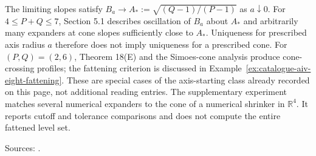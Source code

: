 \begin{example}
The limiting slopes satisfy $B_a\to A_*:=\sqrt{(Q-1)/(P-1)}$ as $a\downarrow0$. For $4\leq P+Q\leq7$, Section 5.1 describes oscillation of $B_a$ about $A_*$ and arbitrarily many expanders at cone slopes sufficiently close to $A_*$. Uniqueness for prescribed axis radius $a$ therefore does not imply uniqueness for a prescribed cone. For $(P,Q)=(2,6)$, Theorem 18(E) and the Simoes-cone analysis produce cone-crossing profiles; the fattening criterion is discussed in Example~\ref{ex:catalogue-aiv-eight-fattening}. These are special cases of the axis-starting class already recorded on this page, not additional reading entries. The supplementary experiment matches several numerical expanders to the cone of a numerical shrinker in $\mathbb R^4$. It reports cutoff and tolerance comparisons and does not compute the entire fattened level set.

\par Sources: \cite{CatNeto2026,CatAIV2002}.
\end{example}

